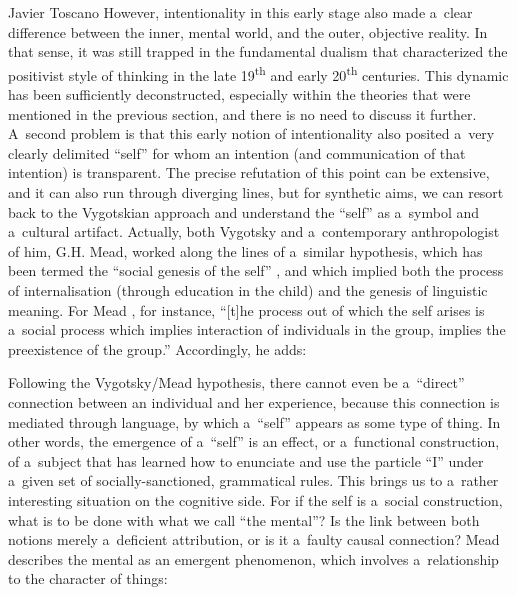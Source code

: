 \begin{artengenv}{Javier Toscano}
However, intentionality in this early stage also made a~clear difference between the inner, mental world, and the outer, objective reality. In that sense, it was still trapped in the fundamental dualism that characterized the positivist style of thinking in the late 19\textsuperscript{th} and early 20\textsuperscript{th} centuries. This dynamic has been sufficiently deconstructed, especially within the theories that were mentioned in the previous section, and there is no need to discuss it further. A~second problem is that this early notion of intentionality also posited a~very clearly delimited ``self'' for whom an intention (and communication of that intention) is transparent. The precise refutation of this point can be extensive, and it can also run through diverging lines, but for synthetic aims, we can resort back to the Vygotskian approach and understand the ``self'' as a~symbol and a~cultural artifact. Actually, both Vygotsky and a~contemporary anthropologist of him, G.H. Mead, worked along the lines of a~similar hypothesis, which has been termed the ``social genesis of the self''
\parencite[][]{glock_vygotsky_1986}, %
 and which implied both the process of internalisation (through education in the child) and the genesis of linguistic meaning. For Mead 
\parencite*[][p.164]{mead_mind_1972}, %
 for instance, ``[t]he process out of which the self arises is a~social process which implies interaction of individuals in the group, implies the preexistence of the group.'' Accordingly, he adds:

Following the Vygotsky/Mead hypothesis, there cannot even be a~``direct'' connection between an individual and her experience, because this connection is mediated through language, by which a~``self'' appears as some type of thing. In other words, the emergence of a~``self'' is an effect, or a~functional construction, of a~subject that has learned how to enunciate and use the particle ``I'' under a~given set of socially-sanctioned, grammatical rules. This brings us to a~rather interesting situation on the cognitive side. For if the self is a~social construction, what is to be done with what we call ``the mental''? Is the link between both notions merely a~deficient attribution, or is it a~faulty causal connection? Mead describes the mental as an emergent phenomenon, which involves a~relationship to the character of things:


\end{artengenv}
